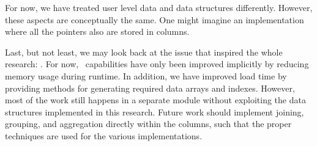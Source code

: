 For now, we have treated user level data and data structures differently. However, these aspects are conceptually the same. One might imagine an implementation where all the pointers also are stored in columns.

Last, but not least, we may look back at the issue that inspired the whole research: \bd. For now, \bd~capabilities have only been improved implicitly by reducing memory usage during runtime. In addition, we have improved load time by providing methods for generating required data arrays and indexes. However, most of the work still happens in a separate module without exploiting the data structures implemented in this research. Future work should implement joining, grouping, and aggregation directly within the columns, such that the proper techniques are used for the various implementations.
